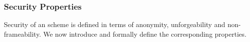 \subsubsection{Security Properties}
\label{sssec:security}
%
Security of an \UAS scheme is defined in terms of anonymity, unforgeability and
non-frameability. We now introduce and formally define the corresponding
properties.





